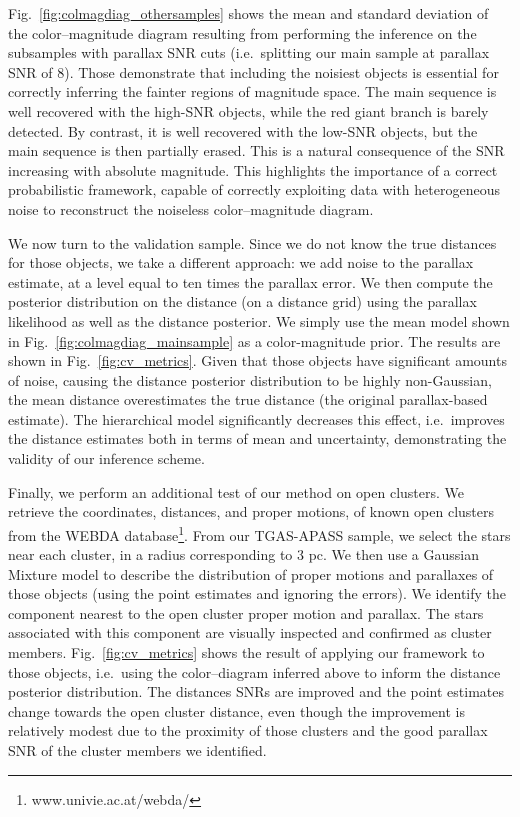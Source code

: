 \documentclass[manuscript, letterpaper]{aastex6}
\newcommand{\ie}{{{i.e.}~}}
\newcommand{\figref}[1]{{\xspace}Fig.~\ref{#1}}
\begin{document}
\figref{fig:colmagdiag_othersamples} shows the  mean and standard deviation of the color--magnitude diagram resulting from performing the inference on the subsamples with parallax SNR cuts (\ie splitting our main sample at parallax SNR of 8). 
Those demonstrate that including the noisiest objects is essential for correctly inferring the fainter regions of magnitude space.
The main sequence is well recovered with the high-SNR objects, while the red giant branch is barely detected. 
By contrast, it is well recovered with the low-SNR objects, but the main sequence is then partially erased.
This is a natural consequence of the SNR increasing with absolute magnitude.
This highlights the importance of a correct probabilistic framework, capable of correctly exploiting data with heterogeneous noise to reconstruct the noiseless color--magnitude diagram.

We now turn to the validation sample. 
Since we do not know the true distances for those objects, we take a different approach: we add noise to the parallax estimate, at a level equal to ten times the parallax error. 
We then compute the posterior distribution on the distance (on a distance grid) using the parallax likelihood as well as the distance posterior. We simply use the mean model shown in \figref{fig:colmagdiag_mainsample} as a color-magnitude prior. 
The results are shown in \figref{fig:cv_metrics}.
Given that those objects have significant amounts of noise, causing the distance posterior distribution to be highly non-Gaussian, the mean distance overestimates the true distance (the original parallax-based estimate). 
The hierarchical model significantly decreases this effect, \ie improves the distance estimates both in terms of mean and uncertainty, demonstrating the validity of our inference scheme.

Finally, we perform an additional test of our method on open clusters.
We retrieve the coordinates, distances, and proper motions, of known open clusters from the WEBDA database\footnote{www.univie.ac.at/webda/}.
From our TGAS-APASS sample, we select the stars near each cluster, in a radius corresponding to 3 pc.
We then use a Gaussian Mixture model to describe the distribution of proper motions and parallaxes of those objects (using the point estimates and ignoring the errors).
We identify the component nearest to the open cluster proper motion and parallax. 
The stars associated with this component are visually inspected and confirmed as cluster members.
\figref{fig:cv_metrics} shows the result of applying our framework to those objects, \ie using the color--diagram inferred above to inform the distance posterior distribution.
The distances SNRs are improved and the point estimates change towards the open cluster distance, even though the improvement is relatively modest due to the proximity of those clusters and the good parallax SNR of the cluster members we identified.
\end{document}
